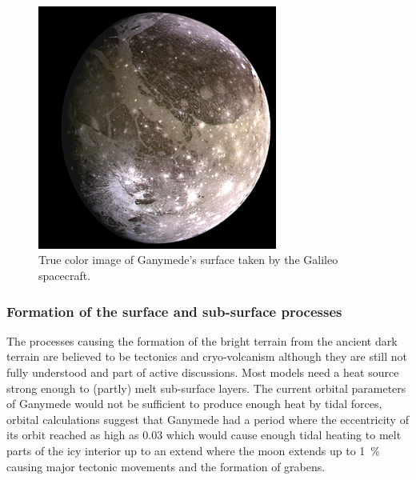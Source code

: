 \begin{figure}
\begin{centering}
\includegraphics[width=0.7\textwidth]{Figures/Ganymede_true_color}
\par\end{centering}

\caption{True color image of Ganymede's surface taken by the Galileo spacecraft.\label{fig:Ganymed-true-color}}


\end{figure}



\subsubsection{Formation of the surface and sub-surface processes\label{sub:volcanism}}

The processes causing the formation of the bright terrain from the
ancient dark terrain are believed to be tectonics and cryo-volcanism
although they are still not fully understood and part of active discussions\cite{Showman2004,Schenk2001,Patterson2010}.
Most models need a heat source strong enough to (partly) melt sub-surface
layers. The current orbital parameters of Ganymede would not be sufficient
to produce enough heat by tidal forces, orbital calculations suggest
that Ganymede had a period where the eccentricity of its orbit reached
as high as 0.03\cite{Showman1997} which would cause enough tidal
heating to melt parts of the icy interior up to an extend where the
moon extends up to 1~\% causing major tectonic movements and the
formation of grabens\cite{Showman2004}. 

